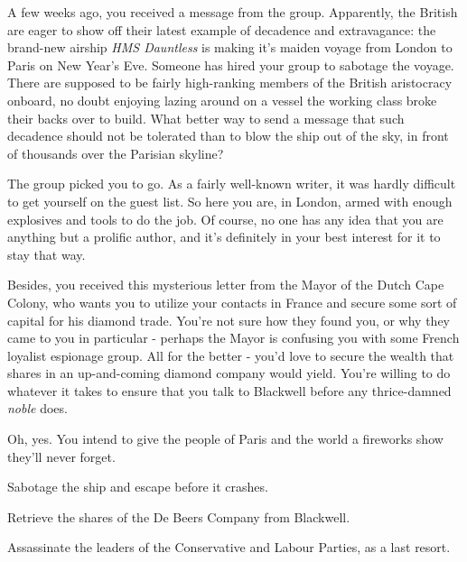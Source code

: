 \documentclass[char]{airship}
\begin{document}
A few weeks ago, you received a message from the group.  Apparently,
the British are eager to show off their latest example of decadence
and extravagance: the brand-new airship {\em HMS Dauntless} is making it's
maiden voyage from London to Paris on New Year's Eve.  Someone has
hired your group to sabotage the voyage.  There are supposed to be
fairly high-ranking members of the British aristocracy onboard, no
doubt enjoying lazing around on a vessel the working class broke their
backs over to build.  What better way to send a message that such
decadence should not be tolerated than to blow the ship out of the
sky, in front of thousands over the Parisian skyline?

The group picked you to go.  As a fairly well-known writer, it was
hardly difficult to get yourself on the guest list.  So here you are,
in London, armed with enough explosives and tools to do the job.  Of
course, no one has any idea that you are anything but a prolific
author, and it's definitely in your best interest for it to stay that
way. 

Besides, you received this mysterious letter from the Mayor of the
Dutch Cape Colony, who wants you to utilize your contacts in France
and secure some sort of capital for his diamond trade. You're not sure
how they found you, or why they came to you in particular - perhaps
the Mayor is confusing you with some French loyalist espionage group.
All for the better - you'd love to secure the wealth that shares in an
up-and-coming diamond company would yield. You're willing to do
whatever it takes to ensure that you talk to Blackwell before any
thrice-damned \textit{noble} does.

Oh, yes. You intend to give the people of Paris and the world a fireworks
show they'll never forget.

\begin{itemz}[Goals]
  \item Sabotage the ship and escape before it crashes.
  \item Retrieve the shares of the De Beers Company from Blackwell.
  \item Assassinate the leaders of the Conservative and Labour Parties, as a last resort.
\end{itemz}
\end{document}
